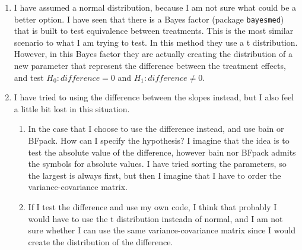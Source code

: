 \documentclass[
]{article}
\providecommand{\tightlist}{%
  \setlength{\itemsep}{0pt}\setlength{\parskip}{0pt}}
\begin{document}
\begin{enumerate}
\def\labelenumi{\arabic{enumi}.}
\item
  I have assumed a normal distribution, because I am not sure what could
  be a better option. I have seen that there is a Bayes factor (package
  \texttt{bayesmed}) that is built to test equivalence between
  treatments. This is the most similar scenario to what I am trying to
  test. In this method they use a t distribution. However, in this Bayes
  factor they are actually creating the distribution of a new parameter
  that represent the difference between the treatment effects, and test
  \(H_0:difference=0\) and \(H_1: difference\neq0\).
\item
  I have tried to using the difference between the slopes instead, but I
  also feel a little bit lost in this situation.

  \begin{enumerate}
  \def\labelenumii{\arabic{enumii}.}
  \tightlist
  \item
    In the case that I choose to use the difference instead, and use
    bain or BFpack. How can I specify the hypothesis? I imagine that the
    idea is to test the absolute value of the difference, however bain
    nor BFpack admits the symbols for absolute values. I have tried
    sorting the parameters, so the largest is always first, but then I
    imagine that I have to order the variance-covariance matrix.
  \item
    If I test the difference and use my own code, I think that probably
    I would have to use the t distribution insteadn of normal, and I am
    not sure whether I can use the same variance-covariance matrix since
    I would create the distribution of the difference.
  \end{enumerate}
\end{enumerate}
\end{document}
